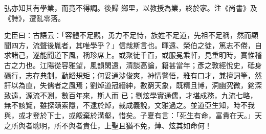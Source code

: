 \begin{pinyinscope}
 弘亦知其有學業，而竟不得調。後歸
 鄉里，以教授為業，終於家。注《尚書》及《詩》，遭亂零落。



 史臣曰：古語云：「容體不足觀，勇力不足恃，族姓不足道，先祖不足稱，然而顯聞四方，流聲後胤者，其唯學乎？」信哉斯言也。暉遠、榮伯之徒，篤志不倦，自求諸己，遂能聞道下風，稱珍席上。或聚徒千百，或服冕乘軒，見重明時，實惟稽古之力也。江陽從容雅望，風韻閑遠，清談高論，籍甚當年；彥之敦經悅史，砥身礪行，志存典制，動蹈規矩；何妥通涉俊爽，神情警悟，雅有口才，兼擅詞筆，然訐以為直，失儒者之風焉；劉焯道冠縉紳，數窮天象，既精且博，洞幽究微，銘深致遠，源流不測，數百年來，斯人而
 已；劉炫學實通儒，才堪成務，九流七略，無不該覽，雖探賾索隱，不逮於焯，裁成義說，文雅過之。並道亞生知，時不我與，或才登於下士，或餒棄於溝壑，惜矣。子夏有言：「死生有命，富貴在天。」天之所與者聰明，所不與者貴仕，上聖且猶不免，焯、炫其如命何！



\end{pinyinscope}